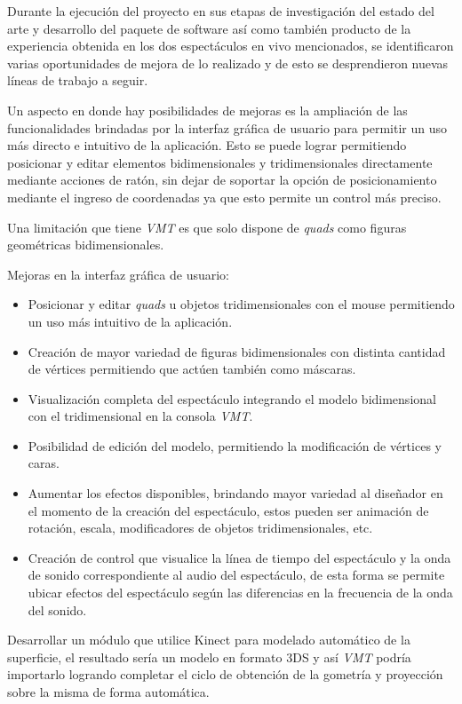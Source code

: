 Durante la ejecución del proyecto en sus etapas de investigación del estado del arte y desarrollo del paquete de software así como también producto de la experiencia obtenida en los dos espectáculos en vivo mencionados, se identificaron varias oportunidades de mejora de lo realizado y de esto se desprendieron nuevas líneas de trabajo a seguir.

Un aspecto en donde hay posibilidades de mejoras es la ampliación de las funcionalidades brindadas por la interfaz gráfica de usuario para permitir un uso más directo e intuitivo de la aplicación.
Esto se puede lograr permitiendo posicionar y editar elementos bidimensionales y tridimensionales directamente mediante acciones de ratón, sin dejar de soportar la opción de posicionamiento mediante el ingreso de coordenadas ya que esto permite un control más preciso.

Una limitación que tiene \emph{VMT} es que solo dispone de \emph{quads} como figuras geométricas bidimensionales.


Mejoras en la interfaz gráfica de usuario:
\begin{itemize}
  \item Posicionar y editar \emph{quads} u objetos tridimensionales con el mouse permitiendo un uso más intuitivo de la aplicación.
  \item Creación de mayor variedad de figuras bidimensionales con distinta cantidad de vértices permitiendo que actúen también como máscaras.
  \item Visualización completa del espectáculo integrando el modelo bidimensional con el tridimensional en la consola \emph{VMT}.
  \item Posibilidad de edición del modelo, permitiendo la modificación de vértices y caras.
  \item Aumentar los efectos disponibles, brindando mayor variedad al diseñador en el momento de la creación del espectáculo, estos pueden ser animación de rotación, escala, modificadores de objetos tridimensionales, etc.
  \item Creación de control que visualice la línea de tiempo del espectáculo y la onda de sonido correspondiente al audio del espectáculo, de esta forma se permite ubicar efectos del espectáculo según las diferencias en la frecuencia de la onda del sonido.
\end{itemize}


Desarrollar un módulo que utilice Kinect para modelado automático de la superficie, el resultado sería un modelo en formato 3DS y así \emph{VMT} podría importarlo logrando completar el ciclo de obtención de la gometría y proyección sobre la misma de forma automática.


